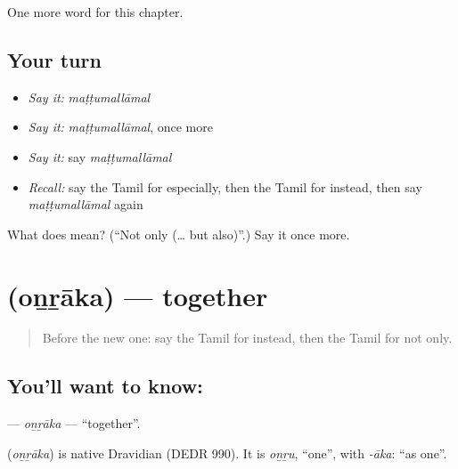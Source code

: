 \begin{grammarlens}[title={What you've built}]
One more word for this chapter.
\end{grammarlens}

\subsection*{Your turn}
\begin{itemize}
\raggedright
  \item \emph{Say it:} \emph{maṭṭumallāmal}
  \item \emph{Say it:} \emph{maṭṭumallāmal}, once more
  \item \emph{Say it:} say \emph{maṭṭumallāmal}
  \item \emph{Recall:} say the Tamil for especially, then the Tamil for instead, then say \emph{maṭṭumallāmal} again
\end{itemize}

\begin{tcolorbox}[breakable,colback=teal!4,colframe=teal!35!black,title={Before you move on}]
What does  mean? (\textquotedblleft{}Not only (… but also)\textquotedblright{}.) Say it once more.
\end{tcolorbox}
\section[\texorpdfstring{\ta{ஒன்றாக} (oṉṟāka)}{ஒன்றாக (oṉṟāka)}]{ (oṉṟāka) — together}

\label{lesson:TA-C237-onraka}



\begin{quote}
Before the new one: say the Tamil for instead, then the Tamil for not only.
\end{quote}

\subsection*{You'll want to know: }
\textbf{} — \emph{oṉṟāka} — \textquotedblleft{}together\textquotedblright{}.

\begin{cousinweb}
\textbf{} (\emph{oṉṟāka}) is native Dravidian (DEDR 990). It is \emph{oṉṟu}, \textquotedblleft{}one\textquotedblright{}, with \emph{-āka}: \textquotedblleft{}as one\textquotedblright{}.
\end{cousinweb}

